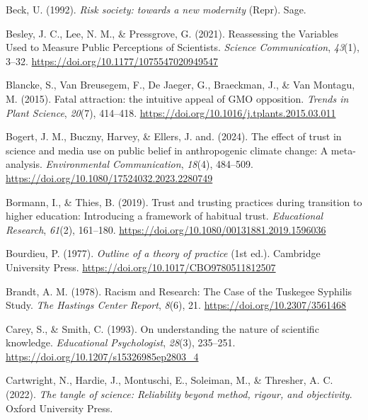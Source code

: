 \documentclass[
  jou,
  floatsintext,
  longtable,
  nolmodern,
  notxfonts,
  notimes,
  colorlinks=true,linkcolor=blue,citecolor=blue,urlcolor=blue]{apa7}
\newlength{\cslhangindent}
\newenvironment{CSLReferences}[2] %
 {\begin{list}{}{%
  \setlength{\itemindent}{0pt}
  \setlength{\leftmargin}{0pt}
  \setlength{\parsep}{0pt}
  \ifodd #1
   \setlength{\leftmargin}{\cslhangindent}
   \setlength{\itemindent}{-1\cslhangindent}
  \fi
  \setlength{\itemsep}{#2\baselineskip}}}
 {\end{list}}
\begin{document}
\begin{CSLReferences}{1}{0}
Beck, U. (1992). \emph{Risk society: towards a new modernity} (Repr).
Sage.

Besley, J. C., Lee, N. M., \& Pressgrove, G. (2021). Reassessing the
Variables Used to Measure Public Perceptions of Scientists.
\emph{Science Communication}, \emph{43}(1), 3--32.
\url{https://doi.org/10.1177/1075547020949547}

Blancke, S., Van Breusegem, F., De Jaeger, G., Braeckman, J., \& Van
Montagu, M. (2015). Fatal attraction: the intuitive appeal of GMO
opposition. \emph{Trends in Plant Science}, \emph{20}(7), 414--418.
\url{https://doi.org/10.1016/j.tplants.2015.03.011}

Bogert, J. M., Buczny, Harvey, \& Ellers, J. and. (2024). The effect of
trust in science and media use on public belief in anthropogenic climate
change: A meta-analysis. \emph{Environmental Communication},
\emph{18}(4), 484--509.
\url{https://doi.org/10.1080/17524032.2023.2280749}

Bormann, I., \& Thies, B. (2019). Trust and trusting practices during
transition to higher education: Introducing a framework of habitual
trust. \emph{Educational Research}, \emph{61}(2), 161--180.
\url{https://doi.org/10.1080/00131881.2019.1596036}

Bourdieu, P. (1977). \emph{Outline of a theory of practice} (1st ed.).
Cambridge University Press.
\url{https://doi.org/10.1017/CBO9780511812507}

Brandt, A. M. (1978). Racism and Research: The Case of the Tuskegee
Syphilis Study. \emph{The Hastings Center Report}, \emph{8}(6), 21.
\url{https://doi.org/10.2307/3561468}

Carey, S., \& Smith, C. (1993). On understanding the nature of
scientific knowledge. \emph{Educational Psychologist}, \emph{28}(3),
235--251. \url{https://doi.org/10.1207/s15326985ep2803_4}

Cartwright, N., Hardie, J., Montuschi, E., Soleiman, M., \& Thresher, A.
C. (2022). \emph{The tangle of science: Reliability beyond method,
rigour, and objectivity}. Oxford University Press.


\end{CSLReferences}
\end{document}
